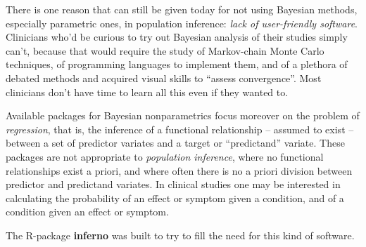 \documentclass{article}
\begin{document}
There is one reason that can still be given today for not using Bayesian methods, especially parametric ones, in population inference: \emph{lack of user-friendly software}. Clinicians who'd be curious to try out Bayesian analysis of their studies simply can't, because that would require the study of Markov-chain Monte Carlo techniques, of programming languages to implement them, and of a plethora of debated methods and acquired visual skills to ``assess convergence''. Most clinicians don't have time to learn all this even if they wanted to.

Available packages for Bayesian nonparametrics focus moreover on the problem of \emph{regression}, that is, the inference of a functional relationship -- assumed to exist -- between a set of predictor variates and a target or ``predictand'' variate. These packages are not appropriate to \emph{population inference}, where no functional relationships exist a priori, and where often there is no a priori division between predictor and predictand variates. In clinical studies one may be interested in calculating the probability of an effect or symptom given a condition, and of a condition given an effect or symptom.

The R-package \textbf{inferno} was built to try to fill the need for this kind of software.







\citep{walker2010}



\end{document}
